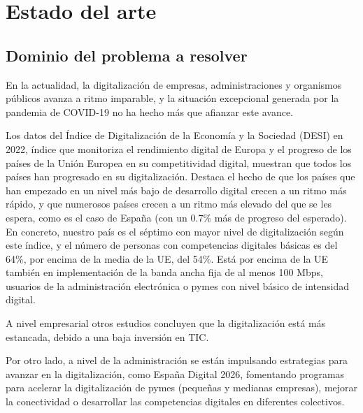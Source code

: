 \chapter{Estado del arte}


\section{Dominio del problema a resolver}

En la actualidad, la digitalización de empresas, administraciones y organismos públicos avanza a ritmo imparable, y la situación excepcional generada por la pandemia de COVID-19 no ha hecho más que afianzar este avance.

Los datos del Índice de Digitalización de la Economía y la Sociedad (DESI) en 2022\cite{desiUE}, índice que monitoriza el rendimiento digital de Europa y el progreso de los países de la Unión Europea en su competitividad digital, muestran que todos los países han progresado en su digitalización. Destaca el hecho de que los países que han empezado en un nivel más bajo de desarrollo digital crecen a un ritmo más rápido, y que numerosos países crecen a un ritmo más elevado del que se les espera, como es el caso de España\cite{desiSpain} (con un 0.7\% más de progreso del esperado).
En concreto, nuestro país es el séptimo con mayor nivel de digitalización según este índice, y el número de personas con competencias digitales básicas es del 64\%, por encima de la media de la UE, del 54\%. Está por encima de la UE también en implementación de la banda ancha fija de al menos 100 Mbps, usuarios de la administración electrónica o pymes con nivel básico de intensidad digital.


A nivel empresarial otros estudios concluyen que la digitalización está más estancada\cite{digitalizacionEmpresaUGT}, debido a una baja inversión en TIC.

Por otro lado, a nivel de la administración se están impulsando estrategias para avanzar en la digitalización, como España Digital 2026\cite{espanaDigital2026}, fomentando programas para acelerar la digitalización de pymes (pequeñas y medianas empresas), mejorar la conectividad o desarrollar las competencias digitales en diferentes colectivos.

